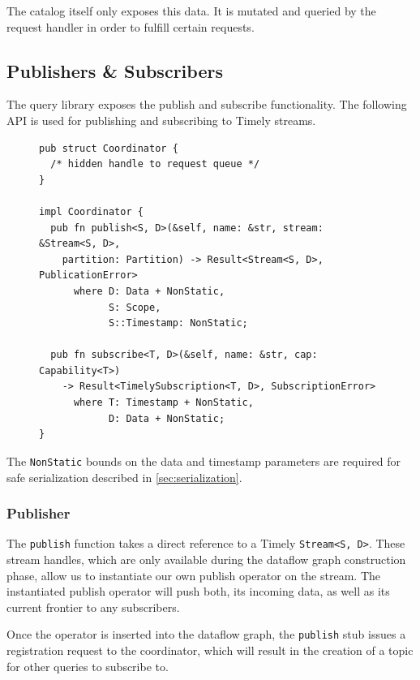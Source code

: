 The catalog itself only exposes this data. It is mutated and queried by the
request handler in order to fulfill certain requests.



\subsection{Publishers \& Subscribers} \label{sec:pubsubimpl}

The query library exposes the publish and subscribe functionality. The following
API is used for publishing and subscribing to Timely streams.

\begin{figure}[h]
\begin{lstlisting}[caption={[Publish \& subscribe interface]
The interface for publishing and subscribing Timely streams.
}]
pub struct Coordinator {
  /* hidden handle to request queue */
}

impl Coordinator {
  pub fn publish<S, D>(&self, name: &str, stream: &Stream<S, D>,
    partition: Partition) -> Result<Stream<S, D>, PublicationError>
      where D: Data + NonStatic, 
            S: Scope,
            S::Timestamp: NonStatic;

  pub fn subscribe<T, D>(&self, name: &str, cap: Capability<T>) 
    -> Result<TimelySubscription<T, D>, SubscriptionError>
      where T: Timestamp + NonStatic, 
            D: Data + NonStatic;
}
\end{lstlisting}
\end{figure}

The \lstinline{NonStatic} bounds on the data and timestamp
parameters are required for safe serialization described in \ref{sec:serialization}.

\subsubsection{Publisher}

The \lstinline{publish} function takes a direct reference to a Timely
\lstinline{Stream<S, D>}. These stream handles, which are only available during
the dataflow graph construction phase, allow us to instantiate our own publish
operator on the stream.  The instantiated publish operator will push both, its
incoming data, as well as its current frontier to any subscribers. 

Once the operator is inserted into the dataflow graph, the \lstinline{publish}
stub issues a registration request to the coordinator, which will result in the
creation of a topic for other queries to subscribe to.

